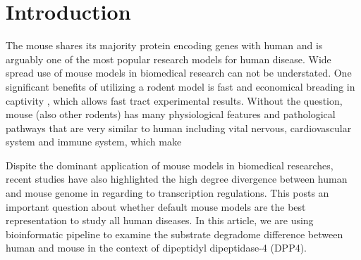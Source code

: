 \section{Introduction}

The mouse shares its majority protein encoding genes with human and is arguably one of the most popular research models for human disease. Wide spread use of mouse models in biomedical research can not be understated. \cite{MORSEIII_2007} One significant benefits of utilizing a rodent model is fast and economical breading in captivity \cite{Rosenthal_2007}, which allows fast tract experimental results. \cite{Vandamme_2014} Without the question, mouse (also other rodents) has many physiological features and pathological pathways that are very similar to human including vital nervous, cardiovascular system and immune system, which make 

Dispite the dominant application of mouse models in biomedical researches, recent studies have also highlighted the high degree divergence between human and mouse genome in regarding to transcription regulations. \cite{25409824} This posts an important question about whether default mouse models are the best representation to study all human diseases. In this article, we are using bioinformatic pipeline to examine the substrate degradome difference between human and mouse in the context of dipeptidyl dipeptidase-4 (DPP4).  


\cite{Justice_2011}